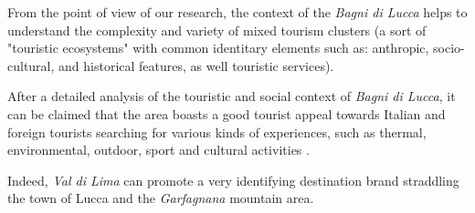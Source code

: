 \documentclass[sustainability,article,submit,pdftex,moreauthors]{Definitions/mdpi}
\begin{document}
From the point of view of our research, the context of the \emph{Bagni di Lucca} helps to understand the complexity and variety of mixed tourism clusters (a sort of "touristic ecosystems" with common identitary elements such as: anthropic, socio-cultural, and historical features, as well touristic services).

After a detailed analysis of the touristic and social context of \emph{Bagni di Lucca}, it can be claimed that the area boasts a good tourist appeal towards Italian and foreign tourists searching for various kinds of experiences, such as thermal, environmental, outdoor, sport and cultural activities  \cite{loz09}.

Indeed, \emph{Val di Lima} can promote a very identifying destination brand straddling the town of Lucca and the \textit{Garfagnana} mountain area. 

\end{document}
